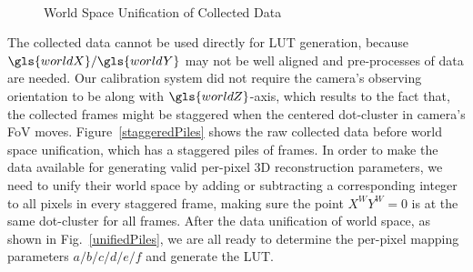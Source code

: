 \\\indent
%
 \begin{figure}[t]
\hspace*{-0.5cm}
\centering
{}
{}
%
\caption{World Space Unification of Collected Data}
\label{worldSpaceDataUnification}
\end{figure}
%
The collected data cannot be used directly for \gls{LUT} generation, because \(\gls{worldX}/\gls{worldY}\) may not be well aligned and pre-processes of data are needed. Our calibration system did not require the camera's observing orientation to be along with \(\gls{worldZ}\)-axis, which results to the fact that, the collected frames might be staggered when the centered dot-cluster in camera's \gls{FoV} moves. Figure~\ref{staggeredPiles} shows the raw collected data before world space unification, which has a staggered piles of frames. In order to make the data available for generating valid per-pixel \gls{3D} reconstruction parameters, we need to unify their world space by adding or subtracting a corresponding integer to all pixels in every staggered frame, making sure the point \(X^WY^W = 0\) is at the same dot-cluster for all frames.	After the data unification of world space, as shown in Fig.~\ref{unifiedPiles}, we are all ready to determine the per-pixel mapping parameters \(a/b/c/d/e/f\) and generate the \gls{LUT}.
%
